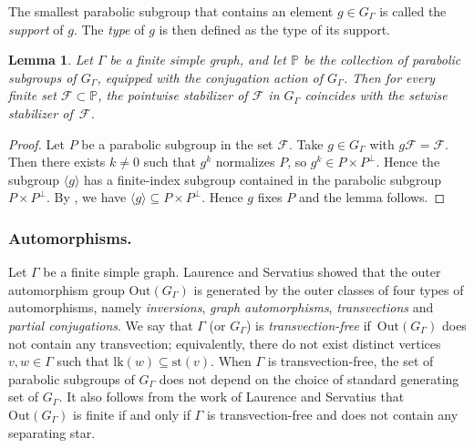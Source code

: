 \documentclass[JEP,XML,SOM,Unicode,NoFloatCountersInSection,published]{cedram}
\let\mathcal\mathscr
\theoremstyle{plain}
\newtheorem{lemma}[theo]{Lemma}
\theoremstyle{definition}
\newcommand{\calf}{\mathcal{F}}
\newcommand{\lk}{\mathrm{lk}}
\newcommand{\Out}{\mathrm{Out}}
\newcommand{\st}{\mathrm{st}}
\begin{document}
The smallest parabolic subgroup that contains an element $g\in G_\Gamma$ is called the \emph{support} of $g$. The \emph{type} of $g$ is then defined as the type of its support.\enlargethispage{.9\baselineskip}%

\begin{lemma}
\label{lemma:setwise vs pointwise}
Let $\Gamma$ be a finite simple graph, and let $\mathbb P$ be the collection of parabolic subgroups of $G_\Gamma$, equipped with the conjugation action of $G_\Gamma$. Then for every finite set $\calf\! \subset\! \mathbb P$, the pointwise stabilizer of $\calf$ in $G_\Gamma$ coincides with the setwise stabilizer of~$\calf$.
\end{lemma}

\begin{proof}
Let $P$ be a parabolic subgroup in the set $\calf$. Take $g\!\in\! G_\Gamma$ with \hbox{$g\calf\!=\!\calf$}. Then there exists $k\!\neq\! 0$ such that $g^k$ normalizes $P$, so $g^k\!\in\! P\times P^\perp$. Hence the sub\-group $\langle g\rangle$ has a finite-index subgroup contained in the parabolic subgroup \hbox{$P\!\times\! P^\perp$}. By \cite[Lem.\,6.4]{minasyan2012hereditary}, we have $\langle g\rangle\subseteq P\times P^\perp$. Hence $g$ fixes $P$ and the lemma follows.
\end{proof}

\subsubsection*{Automorphisms.} Let $\Gamma$ be a finite simple graph. Laurence \cite{laurence1995generating} and Servatius \cite{Ser} showed that the outer automorphism group $\Out(G_\Gamma)$ is generated by the outer classes of four types of automorphisms, namely \emph{inversions}, \emph{graph automorphisms}, \emph{transvections} and \emph{partial conjugations}. We say that $\Gamma$ (or $G_\Gamma$) is \emph{transvection-free} if~$\Out(G_\Gamma)$ does not contain any transvection; equivalently, there do not exist distinct vertices $v,w\in\Gamma$ such that $\lk(w)\subseteq \st(v)$. When $\Gamma$ is transvection-free, the set of parabolic subgroups of $G_\Gamma$ does not depend on the choice of standard generating set of $G_\Gamma$. It also follows from the work of Laurence and Servatius that $\Out(G_\Gamma)$ is finite if and only if $\Gamma$ is transvection-free and does not contain any separating star.
\end{document}
